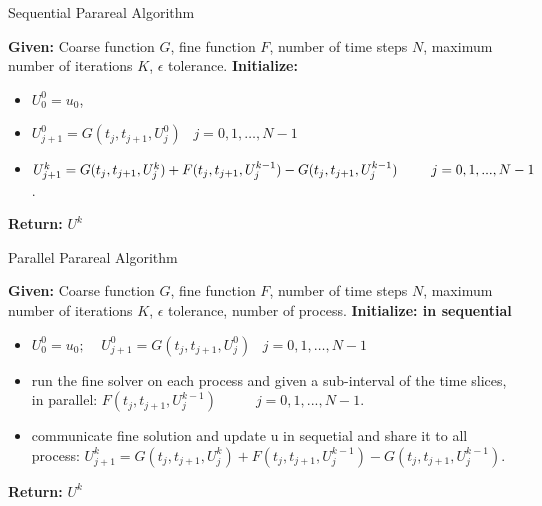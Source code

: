 \documentclass[aspectratio=169,xcolor=dvipsnames, t]{beamer}
\begin{document}
\begin{frame}{Sequential Parareal Algorithm}
    \begin{algorithm}[H]
\caption{Parareal Algorithm}
\begin{algorithmic}[1]
\STATE \textbf{Given:} Coarse function $G$, fine function $F$, number of time steps $N$, maximum number of iterations $K$, $\epsilon$ tolerance.
\STATE \textbf{Initialize:} \begin{itemize}
    \item  $U_0^0 = u_0$,
    \item $ U_{j+1}^0 = G(t_j,t_{j+1}, U_j^0) \;\;\;j = 0,1, \ldots, N-1$
\end{itemize}
    \begin{itemize}
        \item  $ U_{j+1}^k = G(t_j,t_{j+1},U_j^k) + F(t_j,t_{j+1},U_j^{k-1}) -G(t_j,t_{j+1},U_j^{k-1})\;\;\;\;\;\;\;\;\;\;\newline j = 0,1, ... ,N-1$.
    \end{itemize}
\ENDWHILE
\STATE \textbf{Return:} $U^k$
\end{algorithmic}
\end{algorithm}
\end{frame}

\begin{frame}{Parallel Parareal Algorithm}
    \begin{algorithm}[H]
\caption{Parareal Algorithm (parallel version)} 
\begin{algorithmic}[1]
\STATE \textbf{Given:} Coarse function $G$, fine function $F$, number of time steps $N$, maximum number of iterations $K$, $\epsilon$ tolerance, number of process.
\STATE \textbf{Initialize: in sequential} \begin{itemize}
    \item  $U_0^0 = u_0; \;\;\;\; U_{j+1}^0 = G(t_j,t_{j+1}, U_j^0) \;\;\;j = 0,1, \ldots, N-1$
\end{itemize}
    \begin{itemize}
        \item run the fine solver on each process and given a sub-interval of the time slices, in parallel: $F(t_j,t_{j+1}, U_j^{k-1}) \;\;\;\;\;\;\;\;\;\; j = 0,1, ... ,N-1$.
        \item  communicate fine solution and update u in sequetial and share it to all process: $ U_{j+1}^k = G(t_j,t_{j+1},U_j^k) + F(t_j,t_{j+1},U_j^{k-1}) -G(t_j,t_{j+1},U_j^{k-1})$.  
    \end{itemize}
\ENDWHILE
\STATE \textbf{Return:} $U^k$
\end{algorithmic}
\end{algorithm}
\end{frame}
\end{document}
